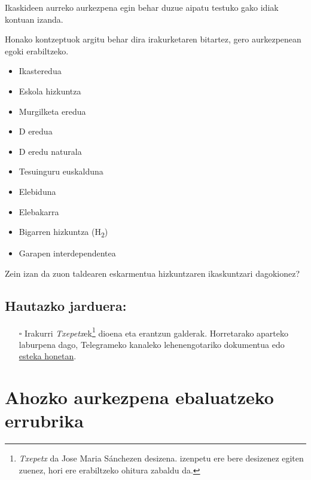 \documentclass[
]{book}
\providecommand{\tightlist}{%
  \setlength{\itemsep}{0pt}\setlength{\parskip}{0pt}}
\begin{document}
Ikaskideen aurreko aurkezpena egin behar duzue aipatu testuko gako idiak kontuan izanda.

Honako kontzeptuok argitu behar dira irakurketaren bitartez, gero aurkezpenean egoki erabiltzeko.

\begin{itemize}
\tightlist
\item
  Ikasteredua
\item
  Eskola hizkuntza
\item
  Murgilketa eredua
\item
  D eredua
\item
  D eredu naturala
\item
  Tesuinguru euskalduna
\item
  Elebiduna
\item
  Elebakarra
\item
  Bigarren hizkuntza (H\textsubscript{2})
\item
  Garapen interdependentea
\end{itemize}

\begin{description}
\tightlist
\item[Lanerako galdera]
Zein izan da zuon taldearen eskarmentua hizkuntzaren ikaskuntzari dagokionez?
\end{description}

\hypertarget{hautazko-jarduera}{%
\section*{Hautazko jarduera:}\label{hautazko-jarduera}}

\begin{itemize}
\tightlist
\item[$\square$]
  Irakurri \emph{Txepetx}ek\footnote{\emph{Txepetx} da Jose Maria Sánchezen desizena. izenpetu ere bere desizenez egiten zuenez, hori ere erabiltzeko ohitura zabaldu da.} dioena eta erantzun galderak. Horretarako aparteko laburpena dago, Telegrameko kanaleko lehenengotariko dokumentua edo \href{https://github.com/JuanAbasolo/HD/blob/01-gaia/1_Txepetx_testuak.pdf}{esteka honetan}.
\end{itemize}

\hypertarget{ahozko-aurkezpena-ebaluatzeko-errubrika}{%
\chapter*{Ahozko aurkezpena ebaluatzeko errubrika}\label{ahozko-aurkezpena-ebaluatzeko-errubrika}}
\end{document}
